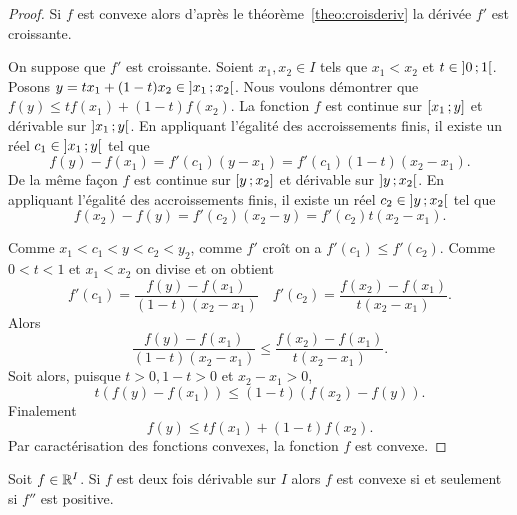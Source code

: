 \begin{proof}
  Si \(f\) est convexe alors d'après le théorème~\ref{theo:croisderiv} 
  la dérivée \(f'\) est croissante.

  On suppose que \(f'\) est croissante. Soient \(x_1,x_2 \in I\) tels que 
  \(x_1<x_2\) et \(t \in \left] 0 \, ; {} 1 \right[\). Posons \(y=tx_1+(1-t)x_2 \in 
  \left] x_1 \, ; {} x_2 \right[\). Nous voulons démontrer que \(f(y) \leqslant 
  tf(x_1)+(1-t)f(x_2)\). La fonction \(f\) est continue sur 
  \(\left[ x_1 \, ; {} y \right]\) et dérivable sur \(\left] x_1 \, ; {} y \right[\). En 
  appliquant l'égalité des accroissements finis, il existe un réel \(c_1 \in 
  \left] x_1 \, ; {} y \right[\) tel que
  \begin{equation}
    f(y)-f(x_1)=f'(c_1)(y-x_1)=f'(c_1)(1-t)(x_2-x_1).
  \end{equation}
  De la même façon \(f\) est continue sur \(\left[ y \, ; {} x_2 \right]\) et dérivable 
  sur \(\left] y \, ; {} x_2 \right[\). En appliquant l'égalité des accroissements 
  finis, il existe un réel \(c_2 \in \left] y \, ; {} x_2 \right[\) tel que
  \begin{equation}
    f(x_2)-f(y)=f'(c_2)(x_2-y)=f'(c_2)t(x_2-x_1).
  \end{equation}

  Comme \(x_1<c_1<y<c_2<y_2\), comme \(f'\) croît on a \(f'(c_1) \leqslant 
  f'(c_2)\). Comme \(0<t<1\) et \(x_1<x_2\) on divise et on obtient
  \begin{equation}
    f'(c_1) = \frac{f(y)-f(x_1)}{(1-t)(x_2-x_1)} \quad f'(c_2) = 
    \frac{f(x_2)-f(x_1)}{t(x_2-x_1)}.
  \end{equation}
  Alors
  \begin{equation}
    \frac{f(y)-f(x_1)}{(1-t)(x_2-x_1)} \leqslant 
    \frac{f(x_2)-f(x_1)}{t(x_2-x_1)}.
  \end{equation}
  Soit alors, puisque \(t>0, 1-t>0\) et \(x_2-x_1>0\),
  \begin{equation}
    t(f(y)-f(x_1)) \leqslant (1-t)(f(x_2)-f(y)).
  \end{equation}
  Finalement
  \begin{equation}
    f(y) \leqslant tf(x_1)+(1-t)f(x_2).
  \end{equation}
  Par caractérisation des fonctions convexes, la fonction \(f\) est convexe.
\end{proof}
\begin{corth}
  Soit \(f \in \mathbb{R}^I\). Si \(f\) est deux fois dérivable sur \(I\) alors \(f\) 
  est convexe si et seulement si \(f''\) est positive.
\end{corth}


